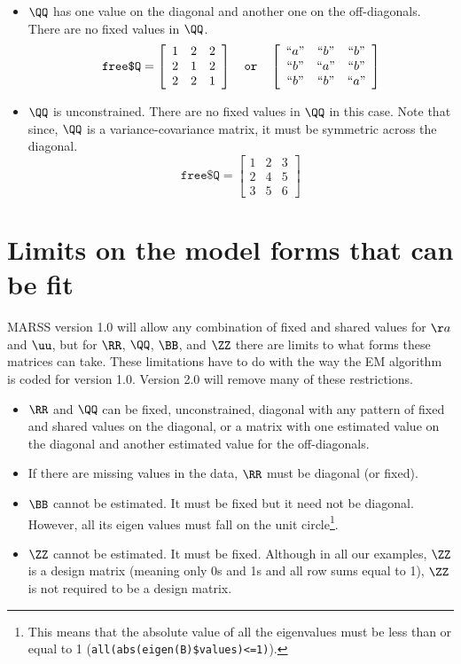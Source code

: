 \begin{itemize}
\item[] $\QQ$ has one value on the diagonal and another one on the off-diagonals. There are no fixed values in $\QQ$.
\begin{equation*}
 \texttt{free\$Q} =
 \left[ \begin{array}{ccc}
    1 & 2 & 2 \\
    2 & 1 & 2 \\
    2 & 2 & 1 \end{array} \right] \quad \texttt{or} \quad
 \left[ \begin{array}{ccc}
    ``a" & ``b" & ``b" \\
    ``b" & ``a" & ``b" \\
    ``b" & ``b" & ``a" \end{array} \right]
\end{equation*}

\item[] $\QQ$ is unconstrained.  There are no fixed values in $\QQ$ in this case.  Note that since, $\QQ$ is a variance-covariance matrix, it must be symmetric across the diagonal.  
\begin{equation*}
 \texttt{free\$Q} =
 \left[ \begin{array}{ccc}
    1 & 2 & 3 \\
    2 & 4 & 5 \\
    3 & 5 & 6 \end{array} \right] 
\end{equation*}
\end{itemize}

\section{Limits on the model forms that can be fit}
MARSS version 1.0 will allow any combination of fixed and shared values for $\aa$ and $\uu$, but for $\RR$, $\QQ$, $\BB$, and $\ZZ$ there are limits to what forms these matrices can take.  These limitations have to do with the way the EM algorithm is coded for version 1.0.  Version 2.0 will remove many of these restrictions.
\begin{itemize}
\item $\RR$ and $\QQ$ can be fixed, unconstrained, diagonal with any pattern of fixed and shared values on the diagonal, or a matrix with one estimated value on the diagonal and another estimated value for the off-diagonals.
\item If there are missing values in the data, $\RR$ must be diagonal (or fixed).
\item $\BB$ cannot be estimated.  It must be fixed but it need not be diagonal.  However, all its eigen values must fall on the unit circle\footnote{ This means that the absolute value of all the eigenvalues must be less than or equal to 1 (\texttt{all(abs(eigen(B)\$values)<=1)}).}.
\item $\ZZ$ cannot be estimated.  It must be fixed.  Although in all our examples, $\ZZ$ is a design matrix (meaning only 0s and 1s and all row sums equal to 1), $\ZZ$ is not required to be a design matrix.
\end{itemize}

